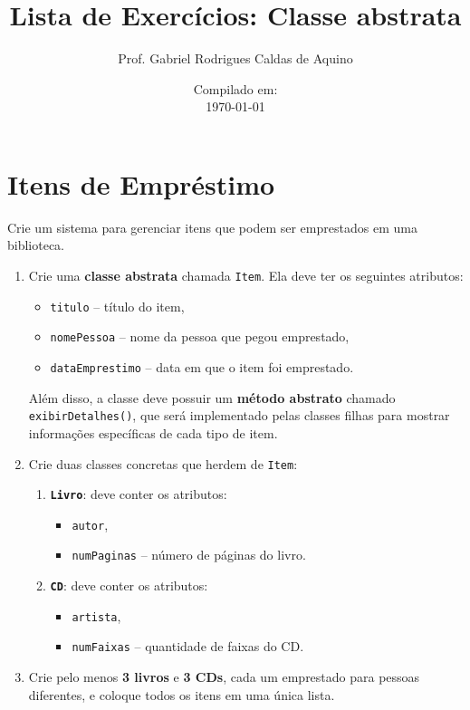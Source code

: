 \documentclass{article}
\title{Lista de Exercícios: Classe abstrata}
\author{Prof. Gabriel Rodrigues Caldas de Aquino}
\date{Compilado em: \\ \today}
\begin{document}
\maketitle

\section{Itens de Empréstimo}

Crie um sistema para gerenciar itens que podem ser emprestados em uma biblioteca.

\begin{enumerate}
    \item Crie uma \textbf{classe abstrata} chamada \texttt{Item}.  
    Ela deve ter os seguintes atributos:
    \begin{itemize}
        \item \texttt{titulo} -- título do item,
        \item \texttt{nomePessoa} -- nome da pessoa que pegou emprestado,
        \item \texttt{dataEmprestimo} -- data em que o item foi emprestado.
    \end{itemize}
    Além disso, a classe deve possuir um \textbf{método abstrato} chamado \texttt{exibirDetalhes()}, 
    que será implementado pelas classes filhas para mostrar informações específicas de cada tipo de item.

    \item Crie duas classes concretas que herdem de \texttt{Item}:
    \begin{enumerate}
        \item \textbf{\texttt{Livro}}: deve conter os atributos:
        \begin{itemize}
            \item \texttt{autor},
            \item \texttt{numPaginas} -- número de páginas do livro.
        \end{itemize}

        \item \textbf{\texttt{CD}}: deve conter os atributos:
        \begin{itemize}
            \item \texttt{artista},
            \item \texttt{numFaixas} -- quantidade de faixas do CD.
        \end{itemize}
    \end{enumerate}

    \item Crie pelo menos \textbf{3 livros} e \textbf{3 CDs}, cada um emprestado para pessoas diferentes, 
    e coloque todos os itens em uma única lista.


\end{enumerate}
\end{document}
